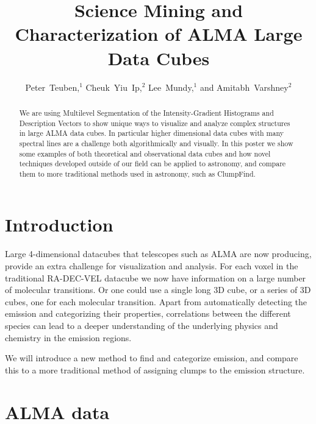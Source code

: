 
\resetcounters


\title{Science Mining and Characterization of ALMA Large Data Cubes}
\author{Peter~Teuben,$^1$ Cheuk~Yiu~Ip,$^2$ Lee~Mundy,$^1$ and Amitabh~Varshney$^2$
}


\begin{abstract}
We are using Multilevel Segmentation of the Intensity-Gradient Histograms and Description Vectors to show unique ways to visualize and analyze complex structures in large ALMA data cubes. In particular higher dimensional data cubes with many spectral lines are a challenge both algorithmically and visually. In this poster we show some examples of both theoretical and observational data cubes and how novel techniques developed outside of our field can be applied to astronomy, and compare them to more traditional methods used in astronomy, such as ClumpFind.
\end{abstract}

\section{Introduction}

Large 4-dimensional datacubes that telescopes such as ALMA are now producing, provide an extra challenge for visualization and analysis. For each voxel in the traditional RA-DEC-VEL datacube we now have information on a large number of molecular transitions. Or one could use a single long 3D cube, or a series of 3D cubes, one for each molecular transition. Apart from automatically detecting the emission and categorizing their properties, correlations between the different species can lead to a deeper understanding of the underlying physics and chemistry in the emission regions.

We will introduce a new method to find and categorize emission, and compare this to a more traditional method of assigning clumps to the emission structure.

\section{ALMA data}

